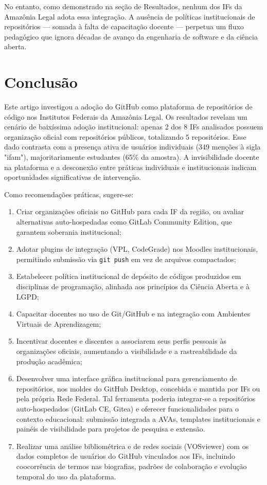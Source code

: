 \documentclass[english, spanish, brazilian]{RBIEarticle}
\begin{document}
No entanto, como demonstrado na seção de Resultados, nenhum dos IFs da Amazônia Legal adota essa integração. A ausência de políticas institucionais de repositórios — somada à falta de capacitação docente — perpetua um fluxo pedagógico que ignora décadas de avanço da engenharia de software e da ciência aberta.
\section{Conclusão}

Este artigo investigou a adoção do GitHub como plataforma de repositórios de código nos Institutos Federais da Amazônia Legal. Os resultados revelam um cenário de baixíssima adoção institucional: apenas 2 dos 8 IFs analisados possuem organização oficial com repositórios públicos, totalizando 5 repositórios. Esse dado contrasta com a presença ativa de usuários individuais (349 menções à sigla "ifam"), majoritariamente estudantes (65\% da amostra). A invisibilidade docente na plataforma e a desconexão entre práticas individuais e institucionais indicam oportunidades significativas de intervenção.

Como recomendações práticas, sugere-se:

\begin{enumerate}
    \item Criar organizações oficiais no GitHub para cada IF da região, ou avaliar alternativas auto-hospedadas como GitLab Community Edition, que garantem soberania institucional;
    \item Adotar plugins de integração (VPL, CodeGrade) nos Moodles institucionais, permitindo submissão via \texttt{git push} em vez de arquivos compactados;
    \item Estabelecer política institucional de depósito de códigos produzidos em disciplinas de programação, alinhada aos princípios da Ciência Aberta e à LGPD;
    \item Capacitar docentes no uso de Git/GitHub e na integração com Ambientes Virtuais de Aprendizagem;
    \item Incentivar docentes e discentes a associarem seus perfis pessoais às organizações oficiais, aumentando a visibilidade e a rastreabilidade da produção acadêmica;
    \item Desenvolver uma interface gráfica institucional para gerenciamento de repositórios, nos moldes do GitHub Desktop, concebida e mantida por IFs ou pela própria Rede Federal. Tal ferramenta poderia integrar-se a repositórios auto-hospedados (GitLab CE, Gitea) e oferecer funcionalidades para o contexto educacional: submissão integrada a AVAs, templates institucionais e painéis de visibilidade para projetos de pesquisa e extensão.
\item Realizar uma análise bibliométrica e de redes sociais (VOSviewer) com os dados completos de usuários do GitHub vinculados aos IFs, incluindo coocorrência de termos nas biografias, padrões de colaboração e evolução temporal do uso da plataforma.
\end{enumerate}
\end{document}
